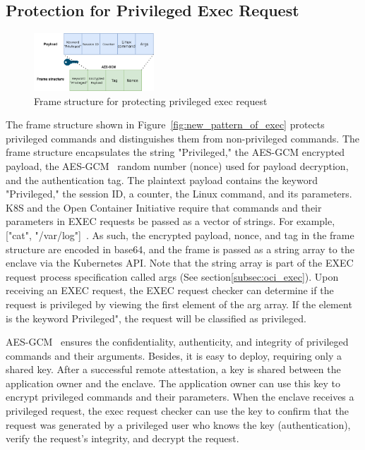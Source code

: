 \subsection{Protection for Privileged Exec Request}
\label{sec:design_prptect_privileged_request}
\begin{figure}[!htb]
    \centering
    \includegraphics[width=0.4\textwidth]{images/exec_frame.png}
    \caption[Frame structure  for protecting privileged exec request]{Frame structure  for protecting privileged exec request}
    \label{fig:exec_frame}
\end{figure}
The frame structure shown in Figure~\ref{fig:new_pattern_of_exec} protects privileged commands and distinguishes them from non-privileged commands. The frame structure encapsulates the string "Privileged," the AES-GCM encrypted payload, the AES-GCM~\cite*{aes_gcm} random number (nonce) used for payload decryption, and the authentication tag. 
The plaintext payload contains the keyword "Privileged," the session ID, a counter,  the Linux command, and its parameters. K8S and the Open Container Initiative require that commands and their parameters in EXEC requests be passed as a vector of strings. For example, ["cat", "/var/log"]~\cite*{k8s}. As such, 
the encrypted payload, nonce, and tag in the frame structure are encoded in base64, and the frame is passed as a string array to the enclave via the Kubernetes API. Note that the string array is part of the EXEC request process specification called args (See section\ref{subsec:oci_exec}). Upon receiving an EXEC request, 
the EXEC request checker can determine if the request is privileged by viewing the first element of the arg array. If the element is the keyword Privileged", the request will be classified as privileged.

AES-GCM~\cite*{aes_gcm} ensures the confidentiality, authenticity, and integrity of privileged commands and their arguments. Besides, it is easy to deploy, requiring only a shared key. After a successful remote attestation, a key is shared between the application owner and the enclave. The application owner can 
use this key to encrypt privileged commands and their parameters. When the enclave receives a privileged request, the exec request checker can use the key to confirm that the request was generated by a privileged user who knows the key (authentication), verify the request's integrity, and decrypt the 
request.


